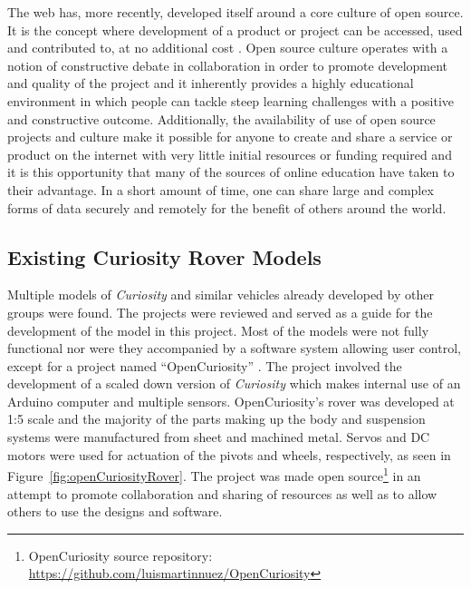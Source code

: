       The web has, more recently, developed itself around a core culture of open source. It is the concept where development of a product or project can be accessed, used and contributed to, at no additional cost \cite{2_monago_2014}. Open source culture operates with a notion of constructive debate in collaboration in order to promote development and quality of the project and it inherently provides a highly educational environment in which people can tackle steep learning challenges with a positive and constructive outcome. Additionally, the availability of use of open source projects and culture make it possible for anyone to create and share a service or product on the internet with very little initial resources or funding required and it is this opportunity that many of the sources of online education have taken to their advantage. In a short amount of time, one can share large and complex forms of data securely and remotely for the benefit of others around the world.
    
    \subsection{Existing Curiosity Rover Models}
      Multiple models of \textit{Curiosity} and similar vehicles already developed by other groups were found. The projects were reviewed and served as a guide for the development of the model in this project. Most of the models were not fully functional nor were they accompanied by a software system allowing user control, except for a project named ``OpenCuriosity'' \cite{opencuriosity2014}. The project involved the development of a scaled down version of \textit{Curiosity} which makes internal use of an Arduino computer and multiple sensors. OpenCuriosity's rover was developed at 1:5 scale and the majority of the parts making up the body and suspension systems were manufactured from sheet and machined metal. Servos and DC motors were used for actuation of the pivots and wheels, respectively, as seen in Figure~\ref{fig:openCuriosityRover}. The project was made open source\footnote{OpenCuriosity source repository: \url{https://github.com/luismartinnuez/OpenCuriosity}} in an attempt to promote collaboration and sharing of resources as well as to allow others to use the designs and software.
      
